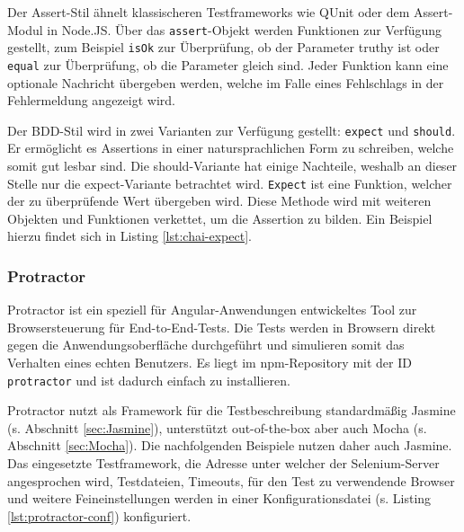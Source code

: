 Der Assert-Stil ähnelt klassischeren Testframeworks wie QUnit oder dem Assert-Modul in Node.JS. Über das \texttt{assert}-Objekt werden Funktionen zur Verfügung gestellt, zum Beispiel \texttt{isOk} zur Überprüfung, ob der Parameter truthy ist oder \texttt{equal} zur Überprüfung, ob die Parameter gleich sind. Jeder Funktion kann eine optionale Nachricht übergeben werden, welche im Falle eines Fehlschlags in der Fehlermeldung angezeigt wird.\cite{chai-assert}

Der BDD-Stil wird in zwei Varianten zur Verfügung gestellt: \texttt{expect} und \texttt{should}. Er ermöglicht es Assertions in einer natursprachlichen Form zu schreiben, welche somit gut lesbar sind. Die should-Variante hat einige Nachteile, weshalb an dieser Stelle nur die expect-Variante betrachtet wird. \texttt{Expect} ist eine Funktion, welcher der zu überprüfende Wert übergeben wird. Diese Methode wird mit weiteren Objekten und Funktionen verkettet, um die Assertion zu bilden.\cite{chai-styles} Ein Beispiel hierzu findet sich in Listing \ref{lst:chai-expect}.

\begin{figure}[H]
	
\end{figure}

\subsubsection{Protractor}
\label{sec:Protractor}
Protractor ist ein speziell für Angular-Anwendungen entwickeltes Tool zur Browsersteuerung für End-to-End-Tests. Die Tests werden in Browsern direkt gegen die Anwendungsoberfläche durchgeführt und simulieren somit das Verhalten eines echten Benutzers. Es liegt im npm-Repository mit der ID \texttt{protractor} und ist dadurch einfach zu installieren.\cite{protractor-index}

Protractor nutzt als Framework für die Testbeschreibung standardmäßig Jasmine (s. Abschnitt \ref{sec:Jasmine}), unterstützt out-of-the-box aber auch Mocha (s. Abschnitt \ref{sec:Mocha}). Die nachfolgenden Beispiele nutzen daher auch Jasmine. Das eingesetzte Testframework, die Adresse unter welcher der Selenium-Server angesprochen wird, Testdateien, Timeouts, für den Test zu verwendende Browser und weitere Feineinstellungen werden in einer Konfigurationsdatei (s. Listing \ref{lst:protractor-conf}) konfiguriert.

\begin{figure}[H]
	
\end{figure}

